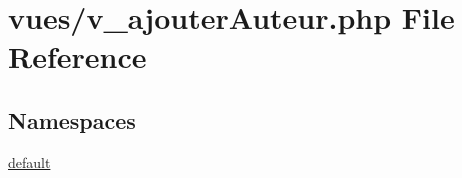 \hypertarget{v__ajouter_auteur_8php}{}\section{vues/v\+\_\+ajouter\+Auteur.php File Reference}
\label{v__ajouter_auteur_8php}
\subsection*{Namespaces}
\begin{DoxyCompactItemize}
\item 
 \hyperlink{namespacedefault}{default}
\end{DoxyCompactItemize}
